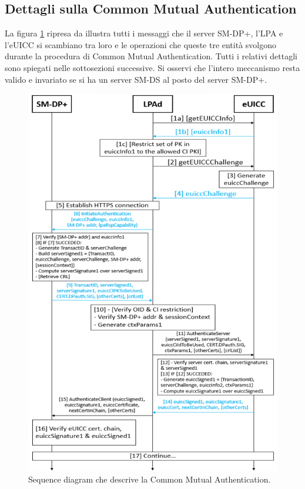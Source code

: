 \documentclass[10pt, oneside]{book}
\begin{document}
\subsection{Dettagli sulla Common Mutual Authentication}\label{sec:mutual-auth}
La figura \ref{fig:common-mutual-auth} ripresa da \cite{GSMA-docs-new} illustra tutti i messaggi che il server SM-DP+, l'LPA e l'eUICC si scambiano tra loro e le operazioni che queste tre entità svolgono durante la procedura di Common Mutual Authentication. Tutti i relativi dettagli \cite{GSMA-docs-new} sono spiegati nelle sottosezioni successive. Si osservi che l'intero meccanismo resta valido e invariato se si ha un server SM-DS al posto del server SM-DP+.
\begin{figure}
\includegraphics[width=\linewidth]{common-mutual-auth.png}
\caption{Sequence diagram che descrive la Common Mutual Authentication.}
\label{fig:common-mutual-auth}
\end{figure}
\end{document}

